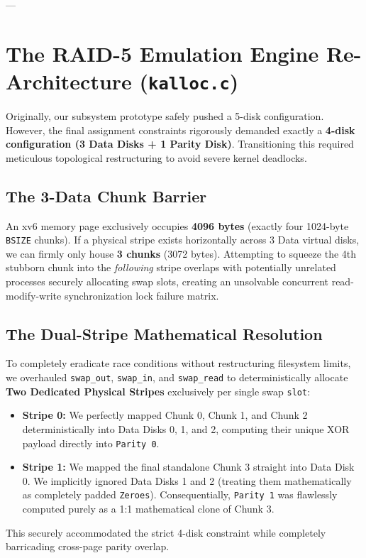 \documentclass[11pt]{article}
\begin{document}
---

\section{The RAID-5 Emulation Engine Re-Architecture (\texttt{kalloc.c})}
Originally, our subsystem prototype safely pushed a 5-disk configuration. However, the final assignment constraints rigorously demanded exactly a \textbf{4-disk configuration (3 Data Disks + 1 Parity Disk)}. Transitioning this required meticulous topological restructuring to avoid severe kernel deadlocks.

\subsection{The 3-Data Chunk Barrier}
An xv6 memory page exclusively occupies \textbf{4096 bytes} (exactly four 1024-byte \texttt{BSIZE} chunks).
If a physical stripe exists horizontally across 3 Data virtual disks, we can firmly only house \textbf{3 chunks} (3072 bytes). Attempting to squeeze the 4th stubborn chunk into the \textit{following} stripe overlaps with potentially unrelated processes securely allocating swap slots, creating an unsolvable concurrent read-modify-write synchronization lock failure matrix.

\subsection{The Dual-Stripe Mathematical Resolution}
To completely eradicate race conditions without restructuring filesystem limits, we overhauled \texttt{swap\_out}, \texttt{swap\_in}, and \texttt{swap\_read} to deterministically allocate \textbf{Two Dedicated Physical Stripes} exclusively per single swap \texttt{slot}:
\begin{itemize}
    \item \textbf{Stripe 0:} We perfectly mapped Chunk 0, Chunk 1, and Chunk 2 deterministically into Data Disks 0, 1, and 2, computing their unique XOR payload directly into \texttt{Parity 0}.
    \item \textbf{Stripe 1:} We mapped the final standalone Chunk 3 straight into Data Disk 0. We implicitly ignored Data Disks 1 and 2 (treating them mathematically as completely padded \texttt{Zeroes}). Consequentially, \texttt{Parity 1} was flawlessly computed purely as a 1:1 mathematical clone of Chunk 3.
\end{itemize}
This securely accommodated the strict 4-disk constraint while completely barricading cross-page parity overlap. 
\end{document}
